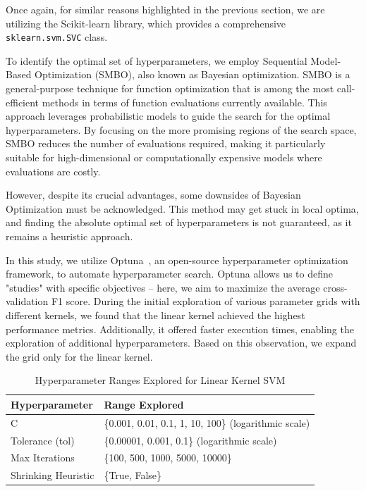 \newpage

Once again, for similar reasons highlighted in the previous section, we are utilizing the Scikit-learn library, which provides a comprehensive \texttt{sklearn.svm.SVC} class.

\vspace{3mm} 

To identify the optimal set of hyperparameters, we employ Sequential Model-Based Optimization (SMBO), also known as Bayesian optimization. SMBO is a general-purpose technique for function optimization that is among the most call-efficient methods in terms of function evaluations currently available. This approach leverages probabilistic models to guide the search for the optimal hyperparameters. By focusing on the more promising regions of the search space, SMBO reduces the number of evaluations required, making it particularly suitable for high-dimensional or computationally expensive models where evaluations are costly.

\vspace{3mm} 

However, despite its crucial advantages, some downsides of Bayesian Optimization must be acknowledged. This method may get stuck in local optima, and finding the absolute optimal set of hyperparameters is not guaranteed, as it remains a heuristic approach.

\vspace{3mm} 

In this study, we utilize Optuna~\cite{akiba2019optuna}, an open-source hyperparameter optimization framework, to automate hyperparameter search. Optuna allows us to define "studies" with specific objectives -- here, we aim to maximize the average cross-validation F1 score. During the initial exploration of various parameter grids with different kernels, we found that the linear kernel achieved the highest performance metrics. Additionally, it offered faster execution times, enabling the exploration of additional hyperparameters. Based on this observation, we expand the grid only for the linear kernel. 

\vspace{3mm} 

\begin{table}[h!]
\centering
\renewcommand{\arraystretch}{1.3} %
\begin{tabular}{ll}
\hline
\textbf{Hyperparameter} & \textbf{Range Explored}                          \\ \hline
C                       & \{0.001, 0.01, 0.1, 1, 10, 100\} (logarithmic scale) \\ 
Tolerance (tol)         & \{0.00001, 0.001, 0.1\} (logarithmic scale)      \\ 
Max Iterations          & \{100, 500, 1000, 5000, 10000\}                  \\ 
Shrinking Heuristic     & \{True, False\}                                  \\ \hline
\end{tabular}
\caption{Hyperparameter Ranges Explored for Linear Kernel SVM}
\label{tab:hyperparameter_ranges}
\end{table}

